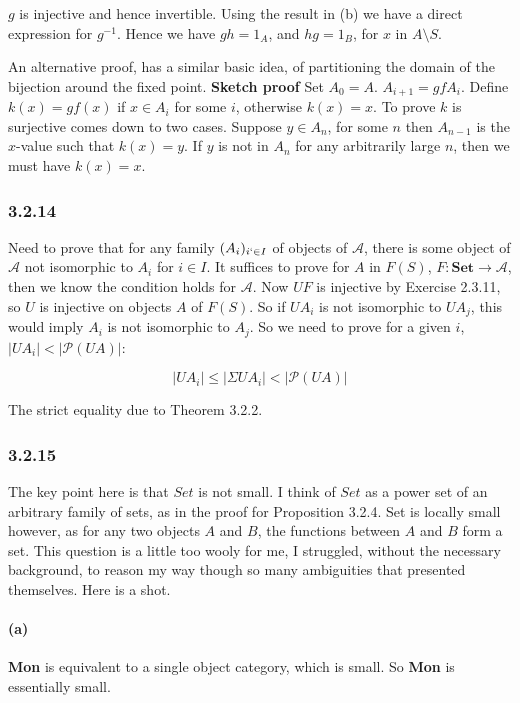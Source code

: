 \documentclass{article}
\begin{document}
$g$ is injective and hence invertible. Using the result in (b) we have a direct expression for $g^{-1}$. Hence we have $gh = 1_A$, and $hg = 1_B$, for $x$ in $A \setminus S$.

An alternative proof, has a similar basic idea, of partitioning the domain of the bijection around the fixed point. \textbf{Sketch proof} Set $A_0 = A$. $A_{i+1} = gfA_{i}$. Define $k(x) = gf(x)$ if $x \in A_{i}$ for some $i$, otherwise $k(x) = x$. To prove $k$ is surjective comes down to two cases. Suppose $y \in A_{n}$, for some $n$ then $A_{n-1}$ is the $x$-value such that $k(x) = y$. If $y$ is not in $A_{n}$ for any arbitrarily large $n$, then we must have $k(x) = x$.

\subsubsection*{3.2.14}

Need to prove that for any family $(A_i)_{i `\in I}$  of objects of $\mathcal{A}$, there is some object of $\mathcal{A}$ not isomorphic to $A_i$ for $i \in I$.
It suffices to prove for $A$ in $F(S)$,  $F: \mathbf{Set} \rightarrow \mathcal{A}$, then we know the condition holds for $\mathcal{A}$. Now $UF$ is injective by Exercise 2.3.11,
so $U$ is injective on objects $A$ of $F(S)$. So if $UA_i$ is not isomorphic to $UA_j$, this would imply $A_i$ is not isomorphic to $A_j$. So we need to prove for a given $i$,  $|UA_i| < |\mathcal{P}(UA)|$:

\begin{equation*}
  |UA_i| \leq |\Sigma UA_i| < |\mathcal{P}(UA)|
\end{equation*}

The strict equality due to Theorem 3.2.2.

\subsubsection*{3.2.15}

The key point here is that $Set$ is not small. I think of $Set$ as a power set of an arbitrary family of sets, as in the proof for Proposition 3.2.4. Set is locally small however, as for any two objects $A$ and $B$, the functions between $A$ and $B$ form a set. This question is a little too wooly for me, I struggled, without the necessary background, to reason my way though so many ambiguities that presented themselves. Here is a shot.

\paragraph{(a)}
\textbf{Mon} is equivalent to a single object category, which is small. So \textbf{Mon} is essentially small.
\end{document}
